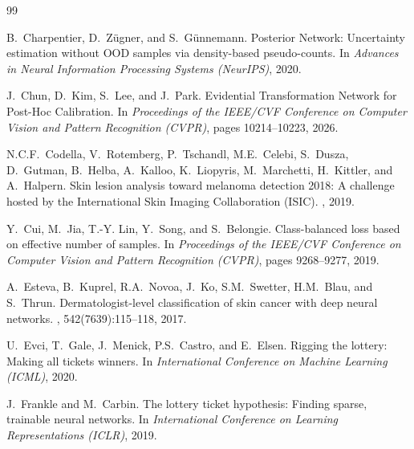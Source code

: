 \documentclass[letterpaper]{article} %
\begin{document}
\begin{thebibliography}{99}

B.~Charpentier, D.~Z{\"u}gner, and S.~G{\"u}nnemann.
\newblock Posterior Network: Uncertainty estimation without OOD samples via density-based pseudo-counts.
\newblock In {\em Advances in Neural Information Processing Systems (NeurIPS)}, 2020.

J.~Chun, D.~Kim, S.~Lee, and J.~Park.
\newblock Evidential Transformation Network for Post-Hoc Calibration.
\newblock In {\em Proceedings of the IEEE/CVF Conference on Computer Vision and Pattern Recognition (CVPR)}, pages 10214--10223, 2026.

N.C.F.~Codella, V.~Rotemberg, P.~Tschandl, M.E.~Celebi, S.~Dusza, D.~Gutman, B.~Helba, A.~Kalloo, K.~Liopyris, M.~Marchetti, H.~Kittler, and A.~Halpern.
\newblock Skin lesion analysis toward melanoma detection 2018: A challenge hosted by the International Skin Imaging Collaboration (ISIC).
, 2019.

Y.~Cui, M.~Jia, T.-Y. Lin, Y.~Song, and S.~Belongie.
\newblock Class-balanced loss based on effective number of samples.
\newblock In {\em Proceedings of the IEEE/CVF Conference on Computer Vision and Pattern Recognition (CVPR)}, pages 9268--9277, 2019.

A.~Esteva, B.~Kuprel, R.A.~Novoa, J.~Ko, S.M.~Swetter, H.M.~Blau, and S.~Thrun.
\newblock Dermatologist-level classification of skin cancer with deep neural networks.
, 542(7639):115--118, 2017.

U.~Evci, T.~Gale, J.~Menick, P.S.~Castro, and E.~Elsen.
\newblock Rigging the lottery: Making all tickets winners.
\newblock In {\em International Conference on Machine Learning (ICML)}, 2020.

J.~Frankle and M.~Carbin.
\newblock The lottery ticket hypothesis: Finding sparse, trainable neural networks.
\newblock In {\em International Conference on Learning Representations (ICLR)}, 2019.


\end{thebibliography}
\end{document}
